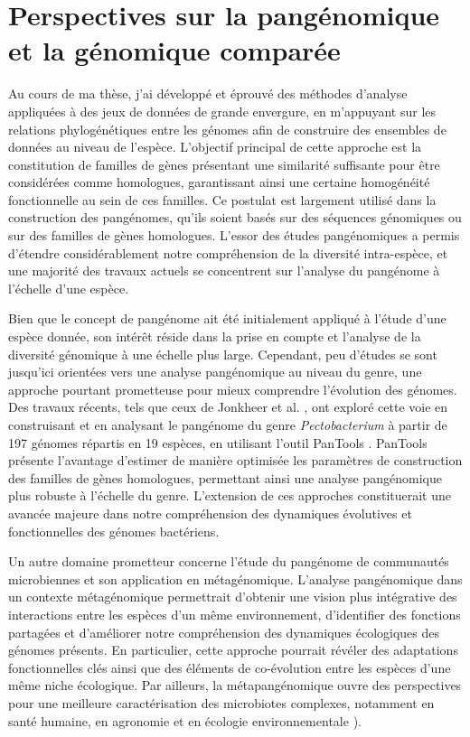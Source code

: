 \chapter{Perspectives sur la pangénomique et la génomique comparée}

Au cours de ma thèse, j’ai développé et éprouvé des méthodes d’analyse appliquées à des jeux de données de grande envergure, en m’appuyant sur les relations phylogénétiques entre les génomes afin de construire des ensembles de données au niveau de l’espèce. L’objectif principal de cette approche est la constitution de familles de gènes présentant une similarité suffisante pour être considérées comme homologues, garantissant ainsi une certaine homogénéité fonctionnelle au sein de ces familles. Ce postulat est largement utilisé dans la construction des pangénomes, qu’ils soient basés sur des séquences génomiques ou sur des familles de gènes homologues. L'essor des études pangénomiques a permis d’étendre considérablement notre compréhension de la diversité intra-espèce, et une majorité des travaux actuels se concentrent sur l’analyse du pangénome à l’échelle d’une espèce.


Bien que le concept de pangénome ait été initialement appliqué à l’étude d’une espèce donnée, son intérêt réside dans la prise en compte et l’analyse de la diversité génomique à une échelle plus large. Cependant, peu d’études se sont jusqu’ici orientées vers une analyse pangénomique au niveau du genre, une approche pourtant prometteuse pour mieux comprendre l’évolution des génomes.
Des travaux récents, tels que ceux de Jonkheer et al. \cite{jonkheer_pectobacterium_2021}, ont exploré cette voie en construisant et en analysant le pangénome du genre \textit{Pectobacterium} à partir de 197 génomes répartis en 19 espèces, en utilisant l’outil PanTools \cite{sheikhizadeh_pantools_2016}. PanTools présente l’avantage d’estimer de manière optimisée les paramètres de construction des familles de gènes homologues, permettant ainsi une analyse pangénomique plus robuste à l’échelle du genre. L’extension de ces approches constituerait une avancée majeure dans notre compréhension des dynamiques évolutives et fonctionnelles des génomes bactériens.

Un autre domaine prometteur concerne l’étude du pangénome de communautés microbiennes et son application en métagénomique. L’analyse pangénomique dans un contexte métagénomique permettrait d’obtenir une vision plus intégrative des interactions entre les espèces d’un même environnement, d’identifier des fonctions partagées et d’améliorer notre compréhension des dynamiques écologiques des génomes présents. En particulier, cette approche pourrait révéler des adaptations fonctionnelles clés ainsi que des éléments de co-évolution entre les espèces d’une même niche écologique. Par ailleurs, la métapangénomique ouvre des perspectives pour une meilleure caractérisation des microbiotes complexes, notamment en santé humaine, en agronomie et en écologie environnementale \cite{delmont_linking_2018}).

